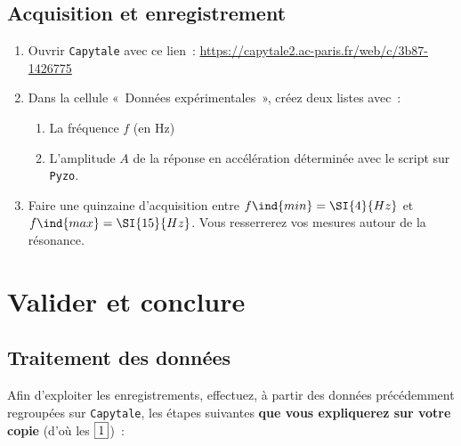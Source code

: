 \documentclass[a4paper, 11pt, final, garamond]{book}
\begin{document}
\subsection{Acquisition et enregistrement}

\begin{enumerate}
    \item Ouvrir \texttt{Capytale} avec ce lien~:
        \url{https://capytale2.ac-paris.fr/web/c/3b87-1426775}
    \item Dans la cellule «~Données expérimentales~», créez deux listes avec~:
        \begin{enumerate}
            \item La fréquence $f$ (en \si{Hz})
            \item L'amplitude $A$ de la réponse en accélération déterminée avec le
                script sur \texttt{Pyzo}.
        \end{enumerate}
    \item Faire une quinzaine d'acquisition entre $f\ind{min} = \SI{4}{Hz}$ et
        $f\ind{max} = \SI{15}{Hz}$. Vous resserrerez vos mesures autour de
        la résonance.
\end{enumerate}

\section{Valider et conclure}
\subsection{Traitement des données}
Afin d'exploiter les enregistrements, effectuez, à partir des données
précédemment regroupées sur \texttt{Capytale}, les étapes suivantes \textbf{que
vous expliquerez sur votre copie} (d'où les $\fbox{1}$)~:
\end{document}
